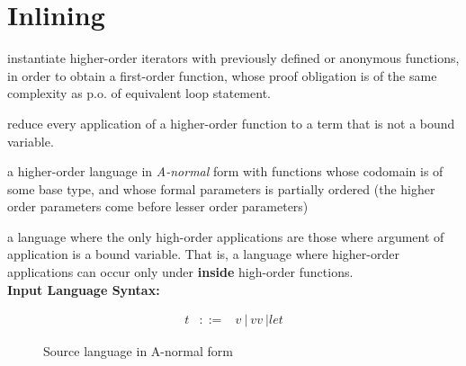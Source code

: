 \section{Inlining}
	
instantiate higher-order iterators with previously defined or anonymous functions, in order to obtain a first-order function, whose proof obligation is of the same complexity as p.o. of equivalent loop statement. 

\quad reduce every application of a higher-order function to a term that
is not a bound variable.

a higher-order language in \textit{A-normal} form with functions whose codomain is of some base type, and whose formal parameters is partially ordered (the higher order parameters come before lesser order parameters)   
 
  a language where the only high-order applications are those where
argument of application is a bound variable. That is, a language where
higher-order applications can occur only under \textbf{inside} high-order functions. \\

\noindent\textbf{Input Language Syntax:} \\

\begin{figure}[H]
\hrulefill
\begin{displaymath}
\begin{array}{lll}
 t & ::= & v ~ | ~ vv ~ | let 
\end{array}
\end{displaymath}
\caption{Source language in A-normal form}
\hrulefill
\end{figure}


 


 